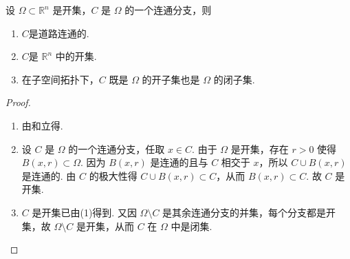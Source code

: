 \documentclass[../../main.tex]{subfiles}%
\begin{document}
\begin{proposition}\label{proposition:Rn中开集的连通分支必是开集}
设 $\Omega\subset \mathbb{R}^n$ 是开集，$C$ 是 $\Omega$ 的一个连通分支，则
\begin{enumerate}[(1)]
\item\label{proposition:Rn中开集的连通分支必是开集-1} $C$是道路连通的.

\item\label{proposition:Rn中开集的连通分支必是开集-2} $C$是 $\mathbb{R}^n$ 中的开集.

\item\label{proposition:Rn中开集的连通分支必是开集-1-3} 在子空间拓扑下，$C$ 既是 $\Omega$ 的开子集也是 $\Omega$ 的闭子集.
\end{enumerate}
\end{proposition}
\begin{proof}
\begin{enumerate}[(1)]
\item 由和立得.

\item 设 $C$ 是 $\Omega$ 的一个连通分支，任取 $x\in C$. 由于 $\Omega$ 是开集，存在 $r>0$ 使得 $B(x,r)\subset \Omega$. 因为 $B(x,r)$ 是连通的且与 $C$ 相交于 $x$，所以 $C\cup B(x,r)$ 是连通的. 由 $C$ 的极大性得 $C\cup B(x,r)\subset C$，从而 $B(x,r)\subset C$. 故 $C$ 是开集.

\item $C$ 是开集已由(1)得到. 又因 $\Omega\setminus C$ 是其余连通分支的并集，每个分支都是开集，故 $\Omega\setminus C$ 是开集，从而 $C$ 在 $\Omega$ 中是闭集.
\end{enumerate}
\end{proof}
\end{document}
